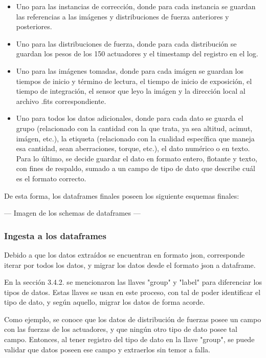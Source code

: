 \begin{itemize}

    \item Uno para las instancias de corrección, donde para cada instancia se guardan las referencias a las imágenes y distribuciones de fuerza anteriores y posteriores.

    \item Uno para las distribuciones de fuerza, donde para cada distribución se guardan los pesos de los 150 actuadores y el timestamp del registro en el log.

    \item Uno para las imágenes tomadas, donde para cada imágen se guardan los tiempos de inicio y término de lectura, el tiempo de inicio de exposición, el tiempo de integración, el sensor que leyo la imágen y la dirección local al archivo .fits correspondiente.

    \item Uno para todos los datos adicionales, donde para cada dato se guarda el grupo (relacionado con la cantidad con la que trata, ya sea altitud, acimut, imágen, etc.), la etiqueta (relacionado con la cualidad específica que maneja esa cantidad, sean aberraciones, torque, etc.), el dato numérico o en texto. Para lo último, se decide guardar el dato en formato entero, flotante y texto, con fines de respaldo, sumado a un campo de tipo de dato que describe cuál es el formato correcto.
    
\end{itemize}

De esta forma, los dataframes finales poseen los siguiente esquemas finales:

--- Imagen de los schemas de dataframes ---

\subsubsection{Ingesta a los dataframes}

Debido a que los datos extraídos se encuentran en formato json, corresponde iterar por todos los datos, y migrar los datos desde el formato json a dataframe.

En la sección 3.4.2. se mencionaron las llaves "group" y "label" para diferenciar los tipos de datos. Estas llaves se usan en este proceso, con tal de poder identificar el tipo de dato, y según aquello, migrar los datos de forma acorde.

Como ejemplo, se conoce que los datos de distribución de fuerzas posee un campo con las fuerzas de los actuadores, y que ningún otro tipo de dato posee tal campo. Entonces, al tener registro del tipo de dato en la llave "group", se puede validar que datos poseen ese campo y extraerlos sin temor a falla.

